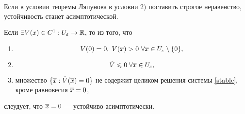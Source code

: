 \begin{ntc}
Если в условии теоремы Ляпунова в условии $2)$ поставить строгое неравенство, устойчивость станет асимптотической.
\end{ntc}

\begin{teo}
Если $\exists V(x) \in C^1 : U_\varepsilon \rightarrow \mathbb{R}$, то из того, что
\begin{enumerate}
\item 
\[
	V(0) = 0,\; V({\overline{x}}) > 0 \ \forall {\overline{x}} \in U_\varepsilon \setminus \{ 0 \},
\]
\item
\[
	\dot V \leqslant 0 \;  \forall {\overline{x}} \in U_\varepsilon,
\]
\item множество $\{{\overline{x}} : \dot V ({\overline{x}}) = 0\}$ не содержит целиком решения системы \eqref{stable}, кроме равновесия ${\overline{x}} = 0$,
\end{enumerate}
слеудует, что ${\overline{x}} = 0$ --- устойчиво асимптотически.
\end{teo}

